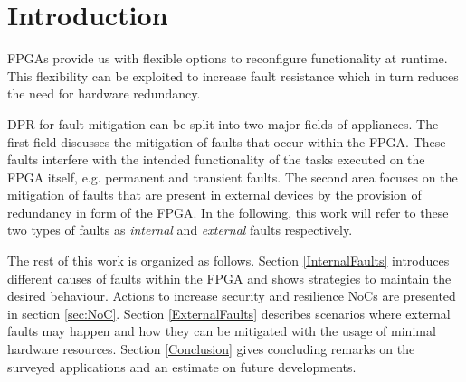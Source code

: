 
\section{Introduction}\label{Introduction}
\glspl{FPGA} provide us with flexible options to reconfigure functionality at runtime. 
This flexibility can be exploited to increase fault resistance which in turn reduces the need for hardware redundancy. 

\gls{DPR} for fault mitigation can be split into two major fields of appliances. 
The first field discusses the mitigation of faults that occur within the \gls{FPGA}.
These faults interfere with the intended functionality of the tasks executed on the \gls{FPGA} itself, e.g. permanent and transient faults. 
The second area focuses on the mitigation of faults that are present in external devices by the provision of redundancy in form of the \gls{FPGA}.
In the following, this work will refer to these two types of faults as \textit{internal} and \textit{external} faults respectively.

The rest of this work is organized as follows.
Section \ref{InternalFaults} introduces different causes of faults within the \gls{FPGA} and shows strategies to maintain the desired behaviour.
Actions to increase security and resilience \glspl{NoC} are presented in section \ref{sec:NoC}.
Section \ref{ExternalFaults} describes scenarios where external faults may happen and how they can be mitigated with the usage of minimal hardware resources. 
Section \ref{Conclusion} gives concluding remarks on the surveyed applications and an estimate on future developments.
